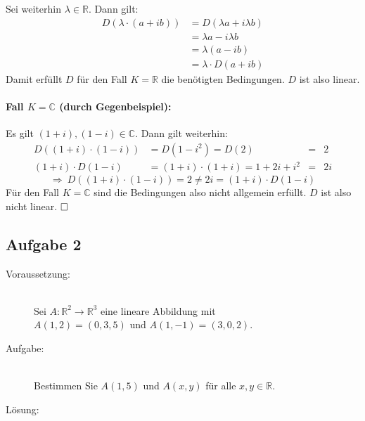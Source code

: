 \documentclass[10pt, a4paper]{article}
\begin{document}
				Sei weiterhin $\lambda \in \mathbb{R}$. Dann gilt:
				\begin{align*}
					D(\lambda\cdot (a+ib)) &= D(\lambda a + i\lambda b)\\
					&= \lambda a - i\lambda b \\
					&= \lambda(a-ib)\\
					&= \lambda\cdot D(a+ib)
				\end{align*}
				Damit erfüllt $D$ für den Fall $K = \mathbb{R}$ die benötigten Bedingungen. $D$ ist also linear.


			\paragraph{Fall $K = \mathbb{C}$ (durch Gegenbeispiel):} %
			\label{par:fall_}
			
				Es gilt $(1+i),(1-i) \in \mathbb{C}$. Dann gilt weiterhin:
				\begin{align*}
					D((1+i)\cdot(1-i)) &= D(1-i^2) = D(2) &=& 2 \\
					(1+i)\cdot D(1-i) &= (1+i)\cdot(1+i) = 1+2i+i^2 &=& 2i
				\end{align*}
				\[
					\Rightarrow \ D((1+i)\cdot(1-i)) = 2 \neq 2i = (1+i)\cdot D(1-i)
				\]
				Für den Fall $K = \mathbb{C}$ sind die Bedingungen also nicht allgemein erfüllt. $D$ ist also nicht linear. $\hfill\Box$




	\newpage

	\subsection*{Aufgabe 2} %
	\label{sub:aufgabe_2}
	
		\begin{description}
			\item[Voraussetzung:]\hfill \\
				Sei $A:\mathbb{R}^2 \longrightarrow \mathbb{R}^3$ eine lineare Abbildung mit\\
				$A(1,2)=(0,3,5)$ und $A(1,-1)=(3,0,2)$.
			\item[Aufgabe:]\hfill \\
				Bestimmen Sie $A(1,5)$ und $A(x,y)$ für alle $x,y \in \mathbb{R}$.
			\item[Lösung:]
		\end{description}
\end{document}
